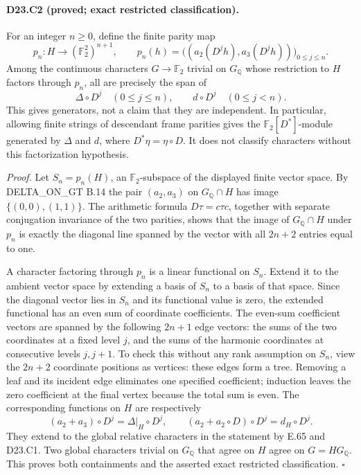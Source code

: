 \paragraph{D23.C2 (proved; exact restricted classification).}
For an integer $n\geq0$, define the finite parity map
\[
 p_n:H\longrightarrow(\mathbb F_2^2)^{n+1},\qquad
 p_n(h)=\bigl((a_2(D^jh),a_3(D^jh))\bigr)_{0\leq j\leq n}.
\]
Among the continuous characters $G\to\mathbb F_2$ trivial on
$G_{\mathbb Q}$ whose restriction to $H$ factors through $p_n$,
all are precisely the span of
\[
 \Delta\circ D^j\quad(0\leq j\leq n),\qquad
 d\circ D^j\quad(0\leq j<n).
\]
This gives generators, not a claim that they are independent.
In particular, allowing finite strings of descendant frame parities
gives the $\mathbb F_2[D^*]$-module generated by $\Delta$ and $d$,
where $D^*\eta=\eta\circ D$.  It does not classify characters
without this factorization hypothesis.

\emph{Proof.}
Let $S_n=p_n(H)$, an $\mathbb F_2$-subspace of the displayed
finite vector space.  By DELTA\_ON\_GT B.14 the pair $(a_2,a_3)$
on $G_{\mathbb Q}\cap H$ has image $\{(0,0),(1,1)\}$.
The arithmetic formula $D\tau=c\tau c$, together with separate
conjugation invariance of the two parities, shows that the image
of $G_{\mathbb Q}\cap H$ under $p_n$ is exactly the diagonal line
spanned by the vector with all $2n+2$ entries equal to one.

A character factoring through $p_n$ is a linear functional on
$S_n$.  Extend it to the ambient vector space by extending a
basis of $S_n$ to a basis of that space.  Since the diagonal
vector lies in $S_n$ and its functional value is zero, the
extended functional has an even sum of coordinate coefficients.
The even-sum coefficient vectors are spanned by the following
$2n+1$ edge vectors: the sums of the two coordinates at a fixed
level $j$, and the sums of the harmonic coordinates at consecutive
levels $j,j+1$.  To check this without any rank assumption on
$S_n$, view the $2n+2$ coordinate positions as vertices: these
edges form a tree.  Removing a leaf and its incident edge eliminates
one specified coefficient; induction leaves the zero coefficient
at the final vertex because the total sum is even.  The corresponding
functions on $H$ are respectively
\[
 (a_2+a_3)\circ D^j=\Delta|_H\circ D^j,
 \qquad (a_2+a_2\circ D)\circ D^j=d_H\circ D^j.
\]
They extend to the global relative characters in the statement by
E.65 and D23.C1.  Two global characters trivial on $G_{\mathbb Q}$
that agree on $H$ agree on $G=HG_{\mathbb Q}$.  This proves both
containments and the asserted exact restricted classification.
\hfill$\square$

